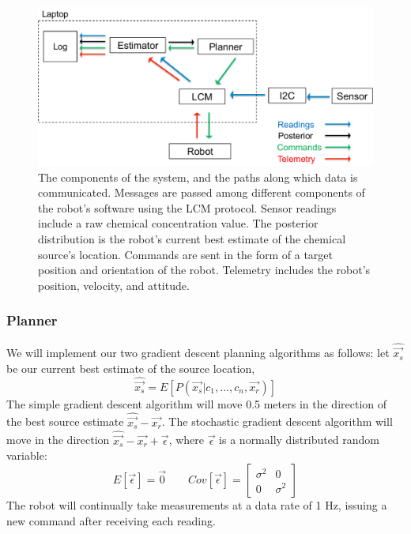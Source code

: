 \documentclass[submit]{aiaa-pretty-modified}
\begin{document}
\begin{figure}
\begin{center}
\includegraphics[width=6in]{img/acquisition.pdf}
\caption{The components of the system, and the paths along which data is
  communicated. Messages are passed among different components of the robot's
  software using the LCM protocol.  Sensor readings include a raw
  chemical concentration value.  The
  posterior distribution is the robot's current best estimate of the chemical
  source's location. Commands are sent in the form of a target position and
  orientation of the robot. Telemetry includes the robot's position, velocity,
  and attitude.}
\label{fig:acquisition}
\end{center}
\end{figure}

\subsubsection{Planner}

We will implement our two gradient descent planning algorithms as
follows: let $\hat{\vec{x_s}}$ be our current best estimate of the
source location, 
\begin{equation}
\hat{\vec{x_s}} = E[P(\vec{x_s}|c_1, \dots ,c_{n},\vec{x_r})]
\end{equation}
The simple gradient descent algorithm will move 0.5 meters in the
direction of the best source estimate $\hat{\vec{x_s}} - \vec{x_r}$.
The stochastic gradient descent algorithm will move in the direction
$\hat{\vec{x_s}} - \vec{x_r} + \vec{\epsilon}$, where $\vec{\epsilon}$
is a normally distributed random variable:
\begin{equation}
E[\vec{\epsilon}] = \vec{0} \qquad Cov[\vec{\epsilon}] = 
\left[\begin{array}{cc} \sigma^2 & 0 \\ 0 & \sigma^2 \end{array}\right]
\end{equation}
The robot will continually take measurements at a data rate of 1 Hz, issuing a
new command after receiving each reading.
\end{document}
